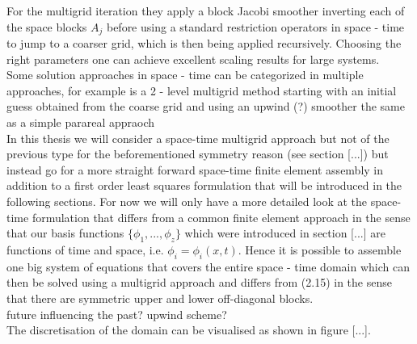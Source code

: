 \documentclass[../draft_1.tex]{subfiles}
\begin{document}
For the multigrid iteration they apply a block Jacobi smoother inverting each of the space blocks $A_j$ before using a standard restriction operators in space - time to jump to a coarser grid, which is then being applied recursively. Choosing the right parameters one can achieve excellent scaling results for large systems. 
\smallskip
\\
Some solution approaches in space - time can be categorized in multiple approaches, for example is a 2 - level multigrid method starting with an initial guess obtained from the coarse grid and using an upwind (?) smoother the same as a simple parareal appraoch \cite{}  
\smallskip
\\
In this thesis we will consider a space-time multigrid approach but not of the previous type for the beforementioned symmetry reason (see section [...]) but instead go for a more straight forward space-time finite element assembly in addition to a first order least squares formulation that will be introduced in the following sections. For now we will only have a more detailed look at the space-time formulation that differs from a common finite element approach in the sense that our basis functions $\{\phi_1, ..., \phi_z\}$ which were introduced in section [...] are functions of time and space, i.e. $\phi_i = \phi_i(x,t)$. Hence it is possible to assemble one big system of equations that covers the entire space - time domain which can then be solved using a multigrid approach and differs from (2.15) in the sense that there are symmetric upper and lower off-diagonal blocks. 
\bigskip
\\
future influencing the past? upwind scheme?
\bigskip
\\
The discretisation of the domain can be visualised as shown in figure [...].
\begin{figure}[ht!]
	\centering
	
	
\end{figure}
\end{document}
